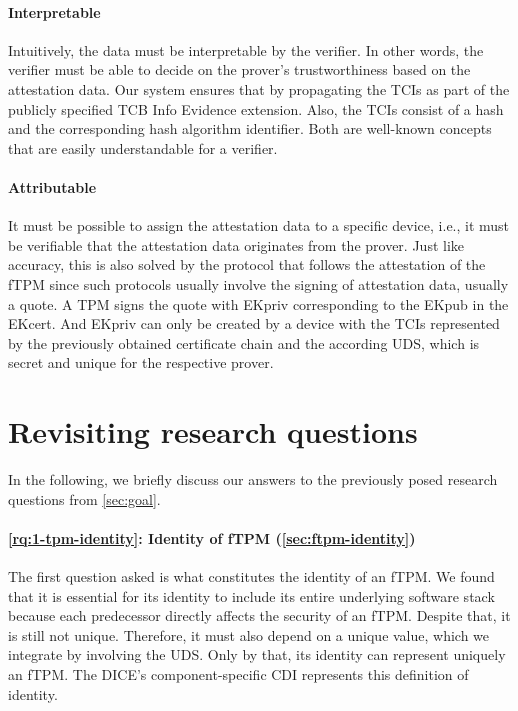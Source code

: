 \paragraph{Interpretable}
Intuitively, the data must be interpretable by the verifier.
In other words, the verifier must be able to decide on the prover's trustworthiness based on the attestation data.
Our system ensures that by propagating the TCIs as part of the publicly specified TCB Info Evidence extension.
Also, the TCIs consist of a hash and the corresponding hash algorithm identifier.
Both are well-known concepts that are easily understandable for a verifier.

\paragraph{Attributable}
It must be possible to assign the attestation data to a specific device, i.e., it must be verifiable that the attestation data originates from the prover.
Just like accuracy, this is also solved by the protocol that follows the attestation of the fTPM since such protocols usually involve the signing of attestation data, usually a quote.
A \ac{TPM} signs the quote with EKpriv corresponding to the EKpub in the EKcert.
And EKpriv can only be created by a device with the \acp{TCI} represented by the previously obtained certificate chain and the according \ac{UDS}, which is secret and unique for the respective prover.

\section{Revisiting research questions}

In the following, we briefly discuss our answers to the previously posed research questions from \autoref{sec:goal}.


\paragraph{\ref{rq:1-tpm-identity}: Identity of \ac{fTPM} (\autoref{sec:ftpm-identity})}\label{par:identity}
The first question asked is what constitutes the identity of an fTPM\@.
We found that it is essential for its identity to include its entire underlying software stack because each predecessor directly affects the security of an \ac{fTPM}.
Despite that, it is still not unique.
Therefore, it must also depend on a unique value, which we integrate by involving the \ac{UDS}.
Only by that, its identity can represent uniquely an \ac{fTPM}.
The \ac{DICE}'s component-specific \ac{CDI} represents this definition of identity.

